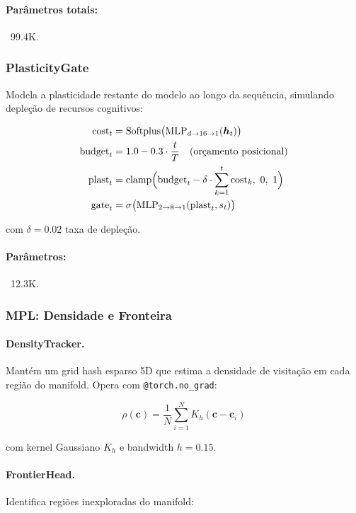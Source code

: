 \paragraph{Par\^ametros totais:} ~99.4K.

\subsubsection{PlasticityGate}
\label{sec:plasticity}

Modela a plasticidade restante do modelo ao longo da sequ\^encia, simulando
deple\c{c}\~ao de recursos cognitivos:

\begin{align}
    \text{cost}_t &= \text{Softplus}\big(\text{MLP}_{d \to 16 \to 1}(\bh_t)\big) \\
    \text{budget}_t &= 1.0 - 0.3 \cdot \frac{t}{T} \quad \text{(or\c{c}amento posicional)} \\
    \text{plast}_t &= \text{clamp}\Big(\text{budget}_t - \delta \cdot \sum_{k=1}^{t} \text{cost}_k, \ 0, \ 1\Big) \\
    \text{gate}_t &= \sigma\big(\text{MLP}_{2 \to 8 \to 1}(\text{plast}_t, s_t)\big)
\end{align}

com $\delta = 0.02$ taxa de deple\c{c}\~ao.

\paragraph{Par\^ametros:} ~12.3K.

\subsubsection{MPL: Densidade e Fronteira}
\label{sec:mpl}

\paragraph{DensityTracker.}
Mant\'em um grid hash esparso 5D que estima a densidade de visita\c{c}\~ao
em cada regi\~ao do manifold. Opera com \texttt{@torch.no\_grad}:

\begin{equation}
    \rho(\bm{c}) = \frac{1}{N} \sum_{i=1}^{N} K_h(\bm{c} - \bm{c}_i)
\end{equation}

com kernel Gaussiano $K_h$ e bandwidth $h = 0.15$.

\paragraph{FrontierHead.}
Identifica regi\~oes inexploradas do manifold:

